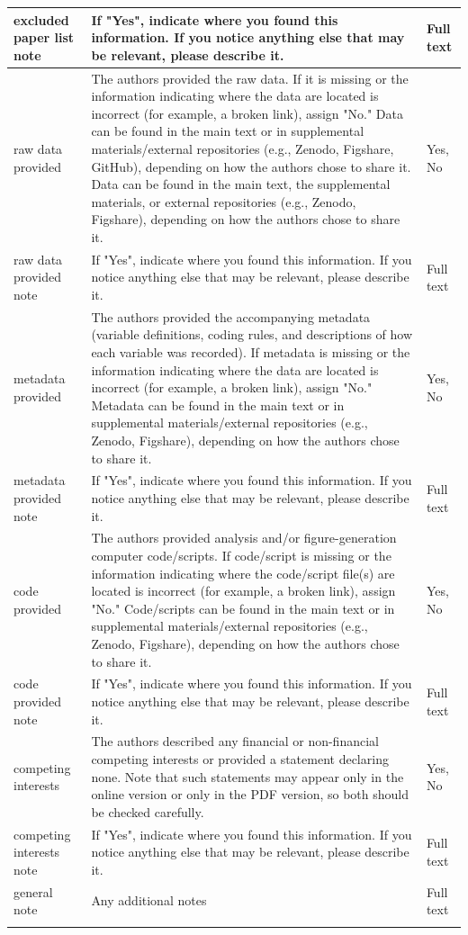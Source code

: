 \documentclass{article}
\begin{document}
\begin{longtable}{p{2cm}|p{5.7cm}|p{2.75cm}}
        \hline
        excluded paper list note & If "Yes", indicate where you found this information. If you notice anything else that may be relevant, please describe it. & Full text \\
        \hline
        raw data provided & The authors provided the raw data. If it is missing or the information indicating where the data are located is incorrect (for example, a broken link), assign "No." Data can be found in the main text or in supplemental materials/external repositories (e.g., Zenodo, Figshare, GitHub), depending on how the authors chose to share it. Data can be found in the main text, the supplemental materials, or external repositories (e.g., Zenodo, Figshare), depending on how the authors chose to share it. & Yes, No \\
        \hline
        raw data provided note & If "Yes", indicate where you found this information. If you notice anything else that may be relevant, please describe it. & Full text \\
        \hline
        metadata provided & The authors provided the accompanying metadata (variable definitions, coding rules, and descriptions of how each variable was recorded). If metadata is missing or the information indicating where the data are located is incorrect (for example, a broken link), assign "No." Metadata can be found in the main text or in supplemental materials/external repositories (e.g., Zenodo, Figshare), depending on how the authors chose to share it. & Yes, No \\
        \hline
        metadata provided note & If "Yes", indicate where you found this information. If you notice anything else that may be relevant, please describe it. & Full text \\
        \hline
        code provided & The authors provided analysis and/or figure-generation computer code/scripts. If code/script is missing or the information indicating where the code/script file(s) are located is incorrect (for example, a broken link), assign "No." Code/scripts can be found in the main text or in supplemental materials/external repositories (e.g., Zenodo, Figshare), depending on how the authors chose to share it. & Yes, No \\
        \hline
        code provided note & If "Yes", indicate where you found this information. If you notice anything else that may be relevant, please describe it. & Full text \\
        \hline
        competing interests & The authors described any financial or non-financial competing interests or provided a statement declaring none. Note that such statements may appear only in the online version or only in the PDF version, so both should be checked carefully. & Yes, No \\
        \hline
        competing interests note & If "Yes", indicate where you found this information. If you notice anything else that may be relevant, please describe it. & Full text \\
        \hline
        general note & Any additional notes & Full text\\
        & &
\label{tab:ROSES}
\end{longtable}
\end{document}
